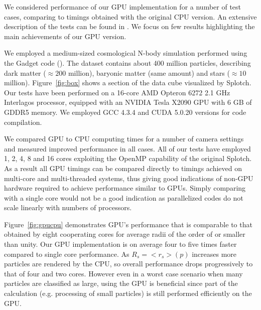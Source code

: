 We considered performance of our GPU implementation for a number of test cases,
comparing to timings obtained with the original CPU version. An extensive description of the 
tests can be found in \citet{cusplotch}. We focus on few results highlighting the main achievements
of our GPU version.

We employed a medium-sized cosmological
N-body simulation performed using the Gadget code (\citet{springel2005}). The dataset contains about
400 million particles, describing dark matter ($\approx 200$ million),
baryonic matter (same amount) and stars ($\approx 10$ million).
Figure~\ref{fig:box} shows a section of the data cube visualized by Splotch.
Our tests have been performed on a 16-core AMD Opteron 6272 2.1 GHz Interlagos processor, equipped with 
an NVIDIA Tesla X2090 GPU with 6 GB of GDDR5 memory.
We employed GCC 4.3.4 and CUDA 5.0.20 versions for code compilation.

We compared GPU to CPU computing times for a number of camera settings and measured improved performance in all cases. All of our tests have employed
1, 2, 4, 8 and 16 cores exploiting the OpenMP capability of the original Splotch. As a result all GPU timings can be compared directly to
timings achieved on multi-core and multi-threaded systems, thus giving good indications of non-GPU hardware required to achieve performance similar to GPUs. Simply comparing with a single core would not be a good indication as parallelized codes do not scale linearly with numbers of processors.

Figure~\ref{fig:gpucpu} demonstrates GPU's performance that is
comparable to that obtained by eight cooperating cores for average radii of the order of or smaller
than unity. Our GPU implementation is on average four to five times faster compared to single
core performance. As $R_s=<r_s>(p)$ increases more particles are rendered by the CPU, so overall performance drops progressively to that of four and two cores. However even in
a worst case scenario when many particles are classified as large, using the GPU is beneficial since part of the calculation (e.g. processing of small particles)
is still performed efficiently on the GPU.

